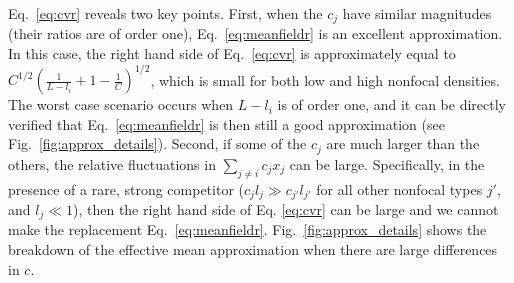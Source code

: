 \documentclass[12pt]{article}
\begin{document}
Eq.~\eqref{eq:cvr} reveals two key points. First, when the $c_j$ have similar magnitudes (their ratios are of order one), Eq.~\eqref{eq:meanfieldr} is an excellent approximation. In this case, the right hand side of Eq.~\eqref{eq:cvr} is approximately equal to $C^{1/2}\left(\frac{1}{L-l_i}+1-\frac{1}{C}\right)^{1/2}$, which is small for both low and high nonfocal densities. The worst case scenario occurs when $L-l_i$ is of order one, and it can be directly verified that Eq.~\eqref{eq:meanfieldr} is then still a good approximation (see Fig.~\ref{fig:approx_details}). Second, if some of the $c_j$ are much larger than the others, the relative fluctuations in $\sum_{j\neq i} c_j x_j$ can be large. Specifically, in the presence of a rare,  strong competitor ($c_j l_j\gg c_{j'} l_{j'}$ for all other nonfocal types $j'$, and $l_j\ll 1$), then the right hand side of Eq. \eqref{eq:cvr} can be large and we cannot make the replacement Eq.~\eqref{eq:meanfieldr}. Fig.~\ref{fig:approx_details} shows the breakdown of the effective mean approximation when there are large differences in $c$. 
\end{document}
